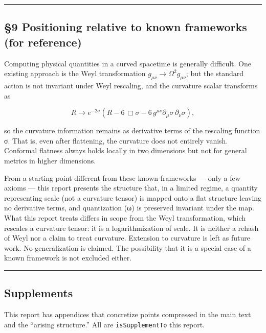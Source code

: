 \documentclass[11pt]{ltjsarticle}
\begin{document}
\begin{center}\rule{0.5\linewidth}{0.5pt}\end{center}

\subsection{§9 Positioning relative to known frameworks (for
reference)}\label{positioning-relative-to-known-frameworks-for-reference}

Computing physical quantities in a curved spacetime is generally
difficult. One existing approach is the Weyl transformation
\(g_{\mu\nu}\to\Omega^2 g_{\mu\nu}\); but the standard action is not
invariant under Weyl rescaling, and the curvature scalar transforms as

\[R \to e^{-2\sigma}\left(R - 6\,\Box\sigma - 6\,g^{\mu\nu}\partial_\mu\sigma\,\partial_\nu\sigma\right),\]

so the curvature information remains as derivative terms of the
rescaling function σ. That is, even after flattening, the curvature does
not entirely vanish. Conformal flatness always holds locally in two
dimensions but not for general metrics in higher dimensions.

From a starting point different from these known frameworks --- only a
few axioms --- this report presents the structure that, in a limited
regime, a quantity representing scale (not a curvature tensor) is mapped
onto a flat structure leaving no derivative terms, and quantization (ω)
is preserved invariant under the map. What this report treats differs in
scope from the Weyl transformation, which rescales a curvature tensor:
it is a logarithmization of scale. It is neither a rehash of Weyl nor a
claim to treat curvature. Extension to curvature is left as future work.
No generalization is claimed. The possibility that it is a special case
of a known framework is not excluded either.

\begin{center}\rule{0.5\linewidth}{0.5pt}\end{center}

\subsection{Supplements}\label{supplements}

This report has appendices that concretize points compressed in the main
text and the ``arising structure.'' All are \texttt{isSupplementTo} this
report.
\end{document}
